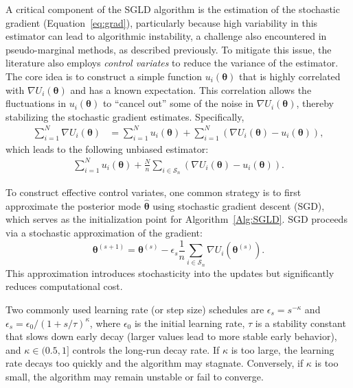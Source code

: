 A critical component of the SGLD algorithm is the estimation of the stochastic gradient (Equation~\ref{eq:grad}), particularly because high variability in this estimator can lead to algorithmic instability, a challenge also encountered in pseudo-marginal methods, as described previously. To mitigate this issue, the literature also employs \textit{control variates} to reduce the variance of the estimator. The core idea is to construct a simple function \( u_i(\boldsymbol{\theta}) \) that is highly correlated with \( \nabla U_i(\boldsymbol{\theta}) \) and has a known expectation. This correlation allows the fluctuations in \( u_i(\boldsymbol{\theta}) \) to ``cancel out'' some of the noise in \( \nabla U_i(\boldsymbol{\theta}) \), thereby stabilizing the stochastic gradient estimates. Specifically,
\begin{align*}
	\sum_{i=1}^N \nabla U_i(\boldsymbol{\theta}) &= \sum_{i=1}^N u_i(\boldsymbol{\theta}) + \sum_{i=1}^N \left( \nabla U_i(\boldsymbol{\theta}) - u_i(\boldsymbol{\theta}) \right),
\end{align*}
which leads to the following unbiased estimator:
\begin{align*}
	\sum_{i=1}^N u_i(\boldsymbol{\theta}) + \frac{N}{n} \sum_{i \in \mathcal{S}_n} \left( \nabla U_i(\boldsymbol{\theta}) - u_i(\boldsymbol{\theta}) \right).
\end{align*}

To construct effective control variates, one common strategy is to first approximate the posterior mode \( \hat{\boldsymbol{\theta}} \) using stochastic gradient descent (SGD), which serves as the initialization point for Algorithm~\ref{Alg:SGLD}. SGD proceeds via a stochastic approximation of the gradient:
\[
\boldsymbol{\theta}^{(s+1)} = \boldsymbol{\theta}^{(s)} - \epsilon_s \frac{1}{n} \sum_{i \in \mathcal{S}_n} \nabla U_i(\boldsymbol{\theta}^{(s)}).
\]
This approximation introduces stochasticity into the updates but significantly reduces computational cost.

Two commonly used learning rate (or step size) schedules are \( \epsilon_s = s^{-\kappa} \) and \( \epsilon_s = \epsilon_0 / (1 + s / \tau)^{\kappa} \), where \( \epsilon_0 \) is the initial learning rate, \( \tau \) is a stability constant that slows down early decay (larger values lead to more stable early behavior), and \( \kappa \in (0.5, 1] \) controls the long-run decay rate. If \( \kappa \) is too large, the learning rate decays too quickly and the algorithm may stagnate. Conversely, if \( \kappa \) is too small, the algorithm may remain unstable or fail to converge. 

